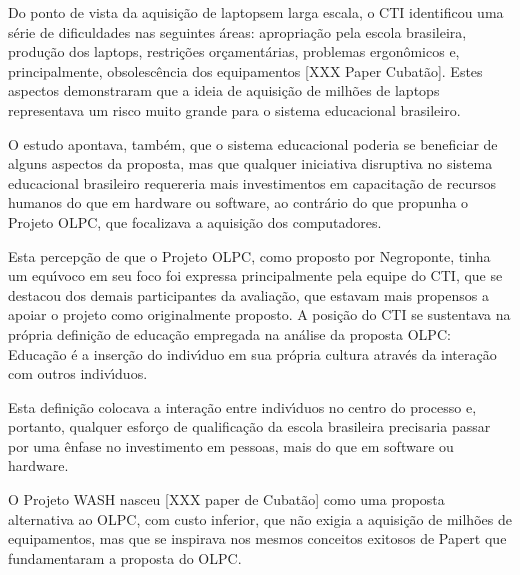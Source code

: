 \documentclass[
12pt,		%
openright,	%
twoside,  %
a4paper,			%
chapter=TITLE,		%
english,			%
french,				%
spanish,			%
brazil				%
]{USPSC-classe/USPSC_RedarTex}
\begin{document}
Do ponto de vista da aquisi\c{c}\~ao de \textquotedbl laptops\textquotedbl  em larga escala, o CTI identificou uma s\'erie de dificuldades nas seguintes \'areas: apropria\c{c}\~ao pela escola brasileira, produ\c{c}\~ao dos laptops, restri\c{c}\~oes or\c{c}ament\'arias, problemas ergon\^omicos e, principalmente, obsolesc\^encia dos equipamentos [XXX Paper Cubat\~ao]. Estes aspectos demonstraram que a ideia de aquisi\c{c}\~ao de milh\~oes de laptops representava um risco muito grande para o sistema educacional brasileiro.








O estudo apontava, tamb\'em, que o sistema educacional poderia se beneficiar de alguns aspectos da proposta, mas que qualquer iniciativa disruptiva no sistema educacional brasileiro requereria mais investimentos em capacita\c{c}\~ao de recursos humanos do que em hardware ou software, ao contr\'ario do que propunha o Projeto OLPC, que focalizava a aquisi\c{c}\~ao dos computadores.








Esta percep\c{c}\~ao de que o Projeto OLPC, como proposto por Negroponte, tinha um equ\'{\i}voco em seu foco foi expressa principalmente pela equipe do CTI, que se destacou dos demais participantes da avalia\c{c}\~ao, que estavam mais propensos a apoiar o projeto como originalmente proposto. A posi\c{c}\~ao do CTI se sustentava na pr\'opria defini\c{c}\~ao de educa\c{c}\~ao empregada na an\'alise da proposta OLPC: \textquotedbl Educa\c{c}\~ao \'e a inser\c{c}\~ao do indiv\'{\i}duo em sua pr\'opria cultura atrav\'es da intera\c{c}\~ao com outros indiv\'{\i}duos.








Esta defini\c{c}\~ao colocava a intera\c{c}\~ao entre indiv\'{\i}duos no centro do processo e, portanto, qualquer esfor\c{c}o de qualifica\c{c}\~ao da escola brasileira precisaria passar por uma \^enfase no investimento em \textquotedbl pessoas, mais do que em software ou hardware\textquotedbl .








O Projeto WASH nasceu [XXX paper de Cubat\~ao] como uma proposta alternativa ao OLPC, com custo inferior, que n\~ao exigia a aquisi\c{c}\~ao de milh\~oes de equipamentos, mas que se inspirava nos mesmos conceitos exitosos de Papert que fundamentaram a proposta do OLPC.
\end{document}
